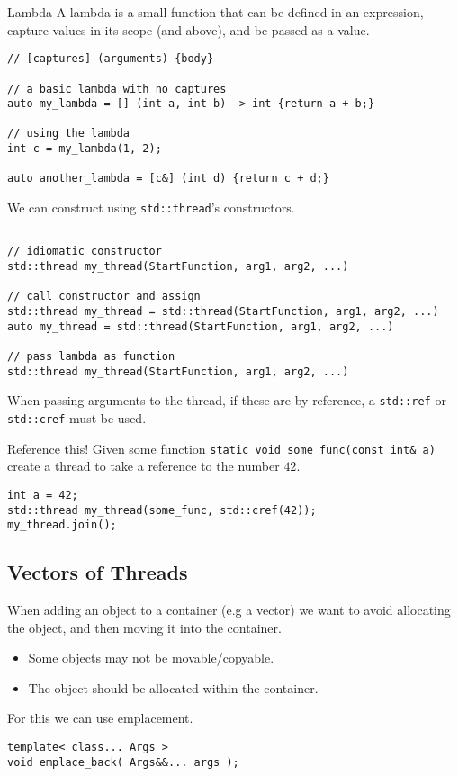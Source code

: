 \begin{definitionbox}{Lambda}
    A lambda is a small function that can be defined in an expression, capture values in its scope (and above), and be passed as a value.
    \begin{verbatim}
// [captures] (arguments) {body}

// a basic lambda with no captures
auto my_lambda = [] (int a, int b) -> int {return a + b;}

// using the lambda
int c = my_lambda(1, 2);

auto another_lambda = [c&] (int d) {return c + d;}
    \end{verbatim} 
\end{definitionbox}
We can construct using \texttt{std::thread}'s constructors.
\begin{verbatim}

// idiomatic constructor
std::thread my_thread(StartFunction, arg1, arg2, ...)

// call constructor and assign
std::thread my_thread = std::thread(StartFunction, arg1, arg2, ...)
auto my_thread = std::thread(StartFunction, arg1, arg2, ...)

// pass lambda as function
std::thread my_thread(StartFunction, arg1, arg2, ...)
\end{verbatim} 

When passing arguments to the thread, if these are by reference, a \texttt{std::ref} or \texttt{std::cref} must be used.

\begin{examplebox}{Reference this!}
  Given some function \texttt{static void some_func(const int& a)} create a thread to take a reference to the number $42$.
  \tcblower
  \begin{verbatim}
int a = 42;
std::thread my_thread(some_func, std::cref(42));
my_thread.join();  
  \end{verbatim}
\end{examplebox}

\subsection{Vectors of Threads}
When adding an object to a container (e.g a vector) we want to avoid allocating the object, and then moving it into the container.
\begin{itemize}
  \item Some objects may not be movable/copyable.
  \item The object should be allocated within the container.
\end{itemize}
For this we can use emplacement.
\begin{verbatim}
template< class... Args >
void emplace_back( Args&&... args );
\end{verbatim}

